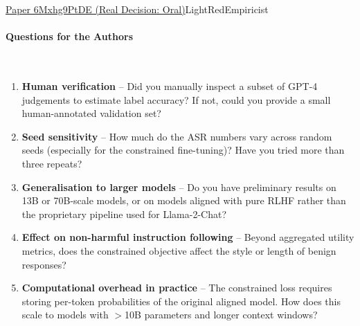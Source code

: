 \documentclass{article} %
\begin{document}
\begin{reviewbox}{\href{https://openreview.net/forum?id=6Mxhg9PtDE}{Paper 6Mxhg9PtDE (Real Decision: Oral)}}{LightRed}{Empiricist}
\paragraph{Questions for the Authors}
\leavevmode\\[0.1em]
\begin{enumerate}[leftmargin=0.5em, itemsep=0pt, topsep=0pt]
  \item \textbf{Human verification} – Did you manually inspect a subset of GPT-4 judgements to estimate label accuracy? If not, could you provide a small human-annotated validation set?
  \item \textbf{Seed sensitivity} – How much do the ASR numbers vary across random seeds (especially for the constrained fine-tuning)? Have you tried more than three repeats?
  \item \textbf{Generalisation to larger models} – Do you have preliminary results on 13B or 70B-scale models, or on models aligned with pure RLHF rather than the proprietary pipeline used for Llama-2-Chat?
  \item \textbf{Effect on non-harmful instruction following} – Beyond aggregated utility metrics, does the constrained objective affect the style or length of benign responses?
  \item \textbf{Computational overhead in practice} – The constrained loss requires storing per-token probabilities of the original aligned model. How does this scale to models with $>$10B parameters and longer context windows?
\end{enumerate}


\end{reviewbox}
\end{document}
